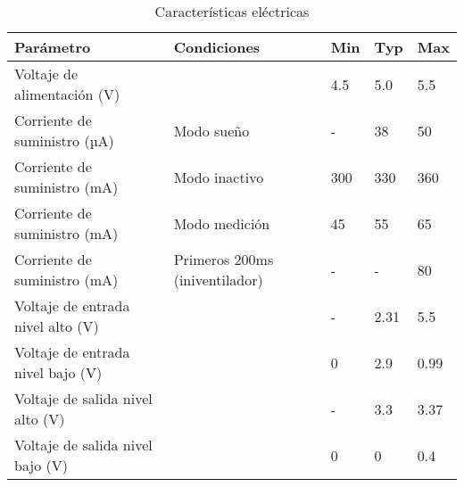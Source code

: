 \begin{table}[H]
\centering
\caption{Características eléctricas}
\label{tab:electrical_characteristics}
\begin{tabular}{|l|l|l|l|l|}
\hline
\textbf{Parámetro}                  & \textbf{Condiciones}                  & \textbf{Min}   & \textbf{Typ}   & \textbf{Max}   \\ \hline
Voltaje de alimentación (V)         &                                       & 4.5            & 5.0            & 5.5            \\ \hline
Corriente de suministro (µA)        & Modo sueño                            & -              & 38             & 50             \\ \hline
Corriente de suministro (mA)        & Modo inactivo                         & 300            & 330            & 360            \\ \hline
Corriente de suministro (mA)        & Modo medición                         & 45             & 55             & 65             \\ \hline
Corriente de suministro (mA)        & Primeros 200ms (iniventilador) & -              & -              & 80             \\ \hline
Voltaje de entrada nivel alto (V)   &                                       & -              & 2.31           & 5.5            \\ \hline
Voltaje de entrada nivel bajo (V)   &                                       & 0              & 2.9            & 0.99           \\ \hline
Voltaje de salida nivel alto (V)    &                                       & -              & 3.3            & 3.37           \\ \hline
Voltaje de salida nivel bajo (V)    &                                       & 0              & 0              & 0.4            \\ \hline
\end{tabular}
\end{table}
